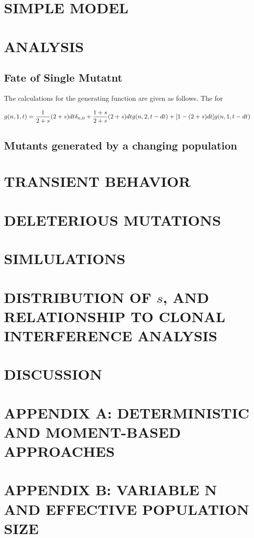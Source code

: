 \documentclass[12pt]{article}
\begin{document}
\section*{SIMPLE MODEL}



\section*{ANALYSIS}
\subsection*{Fate of Single Mutatnt}
The calculations for the generating function are given as follows. The for

\begin{align*}
g(n,1,t)={1\over 2+s}(2+s)dt \delta_{n,0} + {1+s\over 2+s}(2+s)dt g(n,2,t-dt)+[1-(2+s)dt] g(n,1,t-dt)
\end{align*}
\subsection*{Mutants generated by a changing population}

\section*{TRANSIENT BEHAVIOR}
\section*{DELETERIOUS MUTATIONS}
\section*{SIMLULATIONS}
\section*{DISTRIBUTION OF $s$, AND RELATIONSHIP TO CLONAL INTERFERENCE ANALYSIS}
\section*{DISCUSSION}


\section*{APPENDIX A: DETERMINISTIC AND MOMENT-BASED APPROACHES}
\section*{APPENDIX B: VARIABLE N AND EFFECTIVE POPULATION SIZE}
\end{document}
